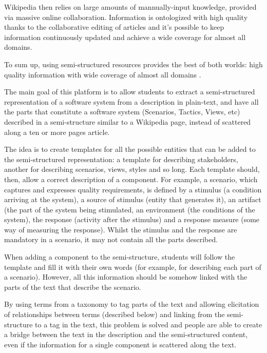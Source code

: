 Wikipedia then relies on large amounts of mannually-input knowledge, provided via massive online collaboration. Information is ontologized with high quality thanks to the collaborative editing of articles and it's possible to keep information continuously updated and achieve a wide coverage for almost all domains. 

To sum up, using semi-structured resources provides the best of both worlds: high quality information with wide coverage of almost all domains \cite{hovy2013collaboratively}.

The main goal of this platform is to allow students to extract a semi-structured representation of a software system from a description in plain-text, and have all the parts that constitute a software system (Scenarios, Tactics, Views, etc) described in a semi-structure similar to a Wikipedia page, instead of scattered along a ten or more pages article. 

The idea is to create templates for all the possible entities that can be added to the semi-structured representation: a template for describing stakeholders, another for describing scenarios, views, styles and so long. Each template should, then, allow a correct description of a component. For example, a scenario, which captures and expresses quality requirements, is defined by a stimulus (a condition arriving at the system), a source of stimulus (entity that generates it), an artifact (the part of the system being stimulated, an environment (the conditions of the system), the response (activity after the stimulus) and a response measure (some way of measuring the response). Whilst the stimulus and the response are mandatory in a scenario, it may not contain all the parts described.

When adding a component to the semi-structure, students will follow the template and fill it with their own words (for example, for describing each part of a scenario). However, all this information should be somehow linked with the parts of the text that describe the scenario.

By using terms from a taxonomy to tag parts of the text and allowing elicitation of relationships between terms (described below) and linking from the semi-structure to a tag in the text, this problem is solved and people are able to create a bridge between the text in the description and the semi-structured content, even if the information for a single component is scattered along the text.  

